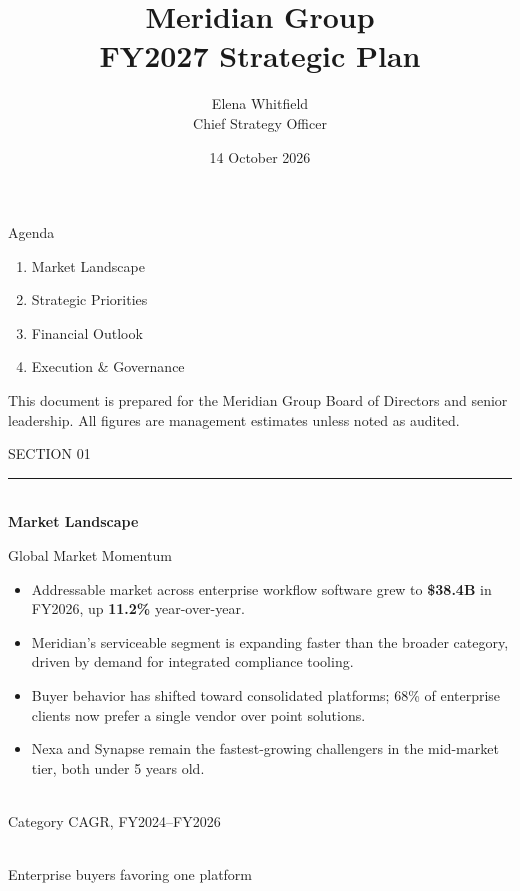 \documentclass[style=ciment]{powerdot}
\title{\textcolor{merinavy}{Meridian Group}\\[6pt]{\large\textcolor{merislate}{FY2027 Strategic Plan}}}
\author{Elena Whitfield\\{\small Chief Strategy Officer}}
\date{14 October 2026}
\newcommand{\sectiondivider}[2]{%
\begin{slide}{}
\vspace{1.6cm}
\begin{center}
{\Large\textsf{\textcolor{merislate}{#1}}}\\[0.5cm]
{\color{meringold}\rule{4.2cm}{1.6pt}}\\[0.6cm]
{\huge\textbf{\textcolor{merinavy}{#2}}}
\end{center}
\end{slide}}
\begin{document}
\maketitle

\begin{slide}{Agenda}
\begin{enumerate}
  \item Market Landscape
  \item Strategic Priorities
  \item Financial Outlook
  \item Execution \& Governance
\end{enumerate}
\vspace{0.8cm}
{\small\textcolor{merislate}{This document is prepared for the Meridian Group Board of Directors and senior leadership. All figures are management estimates unless noted as audited.}}
\end{slide}

\sectiondivider{SECTION 01}{Market Landscape}

\begin{slide}{Global Market Momentum}
\begin{itemize}
  \item[\faGlobe] Addressable market across enterprise workflow software grew to \textbf{\$38.4B} in FY2026, up \textbf{11.2\%} year-over-year.
  \item[\faChartLine] Meridian's serviceable segment is expanding faster than the broader category, driven by demand for integrated compliance tooling.
  \item[\faUsers] Buyer behavior has shifted toward consolidated platforms; 68\% of enterprise clients now prefer a single vendor over point solutions.
  \item[\faBullseye] Nexa and Synapse remain the fastest-growing challengers in the mid-market tier, both under 5 years old.
\end{itemize}
\vspace{0.4cm}
\begin{minipage}[t]{0.48\linewidth}
\begin{tcolorbox}[statbox]
\\
{\small\textcolor{merislate}{Category CAGR, FY2024--FY2026}}
\end{tcolorbox}
\end{minipage}\hfill
\begin{minipage}[t]{0.48\linewidth}
\begin{tcolorbox}[statbox]
\\
{\small\textcolor{merislate}{Enterprise buyers favoring one platform}}
\end{tcolorbox}
\end{minipage}
\end{slide}
\end{document}
